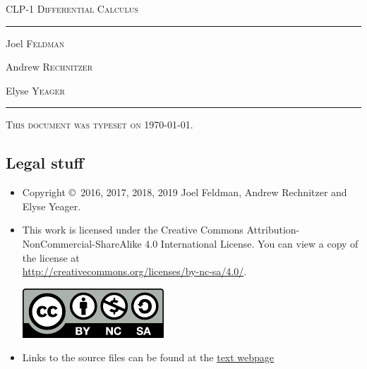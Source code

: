 \documentclass[12pt,letterpaper]{book}
\begin{document}
\setcounter{page}{0}

\begin{titlepage}
\begin{center}
\textsc{\LARGE CLP-1 Differential Calculus
}\\[2ex]

\vspace{5ex}
\hrule
\vspace{5ex}

\begin{minipage}[t]{0.3\textwidth} \begin{flushleft}
\large Joel \textsc{Feldman}
\end{flushleft} \end{minipage}%
\begin{minipage}[t]{0.3\textwidth} \begin{flushleft}
\large Andrew \textsc{Rechnitzer}
\end{flushleft} \end{minipage}%
\begin{minipage}[t]{0.3\textwidth} \begin{flushright}
\large Elyse \textsc{Yeager}
\end{flushright} \end{minipage}%
\end{center}
\vspace{2ex}
\hrule

\vfill
\textsc{This document was typeset on \today.}
\end{titlepage}

\subsection*{Legal stuff}
\begin{itemize}
 \item Copyright \copyright\ 2016, 2017, 2018, 2019 Joel Feldman, Andrew Rechnitzer and Elyse Yeager.

\item This work is licensed under the
Creative Commons Attribution-NonCommercial-ShareAlike 4.0 International
License. You can view a copy of the license at \\
\url{http://creativecommons.org/licenses/by-nc-sa/4.0/}.
\begin{center}
 \includegraphics{by-nc-sa.pdf}
\end{center}


\item Links to the source files can be found at the \href{http://www.math.ubc.ca/~CLP/index.html}{text webpage}
\end{itemize}

\frontmatter


\tableofcontents

\mainmatter

\setcounter{chapter}{-1}





\appendix

\end{document}
